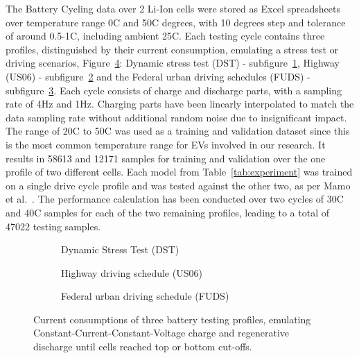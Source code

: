 %
The Battery Cycling data over 2 Li-Ion cells were stored as Excel spreadsheets over temperature range 0\textdegree{}C and 50\textdegree{}C degrees, with 10 degrees step and tolerance of around 0.5-1\textdegree{}C, including ambient 25\textdegree{}C.
Each testing cycle contains three profiles, distinguished by their current consumption, emulating a stress test or driving scenarios, Figure~\ref{fig:current-profs}: Dynamic stress test (DST) - subfigure~\ref{subfig:profs-DST}, Highway (US06) - subfigure~\ref{subfig:profs-US} and the Federal urban driving schedules (FUDS) - subfigure~\ref{subfig:profs-FUDS}.
Each cycle consists of charge and discharge parts, with a sampling rate of 4Hz and 1Hz.
Charging parts have been linearly interpolated to match the data sampling rate without additional random noise due to insignificant impact.
The range of 20\textdegree{}C to 50\textdegree{}C was used as a training and validation dataset since this is the most common temperature range for EVs involved in our research.
It results in 58613 and 12171 samples for training and validation over the one profile of two different cells.
Each model from \mbox{Table~\ref{tab:experiment}} was trained on a single drive cycle profile and was tested against the other two, as per Mamo et al.~\cite{mamo_long_2020}.
The performance calculation has been conducted over two cycles of 30\textdegree{}C and 40\textdegree{}C samples for each of the two remaining profiles, leading to a total of 47022 testing samples.
\begin{figure}[htbp]
    \centering
    \begin{subfigure}[b]{\columnwidth}
        \centering
        
        \caption{Dynamic Stress Test (DST)}
        \label{subfig:profs-DST}
    \end{subfigure}
    \hfill
    \begin{subfigure}[b]{\columnwidth}
        \centering
        
        \caption{Highway driving schedule (US06)}
        \label{subfig:profs-US}
    \end{subfigure}
    \hfill
    \begin{subfigure}[b]{\columnwidth}
        \centering
        
        \caption{Federal urban driving schedule (FUDS)}
        \label{subfig:profs-FUDS}
    \end{subfigure}
    \caption{Current consumptions of three battery testing profiles, emulating Constant-Current-Constant-Voltage charge and regenerative discharge until cells reached top or bottom cut-offs.}
    \label{fig:current-profs}
\end{figure}

